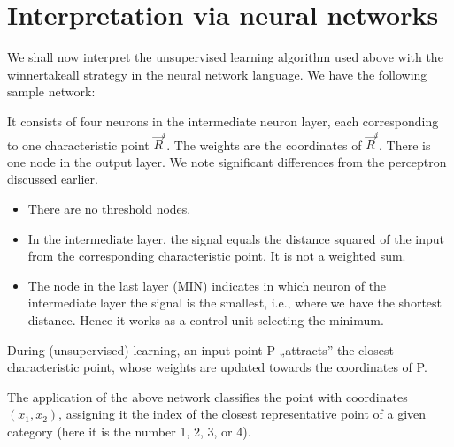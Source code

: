 \documentclass[a4paper,12pt,polish]{jupyterBook}
\begin{document}
\section{Interpretation via neural networks}
\label{\detokenize{docs/unsupervised:interpretation-via-neural-networks}}\label{\detokenize{docs/unsupervised:inn-sec}}
\sphinxAtStartPar
We shall now interpret the unsupervised learning algorithm used above with the winner\sphinxhyphen{}take\sphinxhyphen{}all strategy in the neural network language. We have the following sample network:
\begin{sphinxVerbatimOutput}

\noindent{}
\end{sphinxVerbatimOutput}

\sphinxAtStartPar
It consists of four neurons in the intermediate neuron layer, each corresponding to one characteristic point \(\vec{R}^i\). The weights are the coordinates of \(\vec{R}^i\). There is one node in the output layer. We note significant differences from the perceptron discussed earlier.
\begin{itemize}
\item {} 
\sphinxAtStartPar
There are no threshold nodes.

\item {} 
\sphinxAtStartPar
In the intermediate layer, the signal equals the distance squared of the input from the corresponding characteristic point. It is not a weighted sum.

\item {} 
\sphinxAtStartPar
The node in the last layer (MIN) indicates in which neuron of the intermediate layer the signal is the smallest, i.e., where we have the shortest distance. Hence it works as a control unit selecting the minimum.

\end{itemize}

\sphinxAtStartPar
During (unsupervised) learning, an input point P „attracts” the closest characteristic point, whose weights are updated towards the coordinates of P.

\sphinxAtStartPar
The application of the above network classifies the point with coordinates \((x_1, x_2)\), assigning it the index of the closest representative point of a given category (here it is the number 1, 2, 3, or 4).
\end{document}
